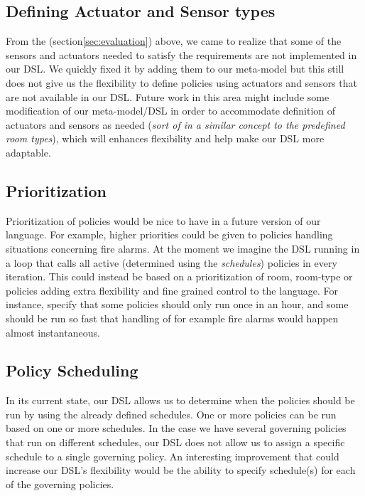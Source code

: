 \subsection{Defining Actuator and Sensor types}\label{subsec:def-sensor-actuator-types}
From the (section\ref{sec:evaluation}) above, we came to realize that some of the sensors and actuators needed to satisfy the requirements are not implemented in our DSL. We quickly fixed it by adding them to our meta-model but this still does not give us the flexibility to define policies using actuators and sensors that are not available in our DSL. Future work in this area might include some modification of our meta-model/DSL in order to accommodate definition of actuators and sensors as needed (\textit{sort of in a similar concept to the predefined room types}), which will enhances flexibility and help make our DSL more adaptable.

\subsection{Prioritization}\label{subsec:looptime}
Prioritization of policies would be nice to have in a future version of our language. For example, higher priorities could be given to policies handling situations concerning fire alarms. At the moment we imagine the DSL running in a loop that calls all active (determined using the \textit{schedules}) policies in every iteration. This could instead be based on a prioritization of room, room-type or policies adding extra flexibility and fine grained control to the language. For instance, specify that some policies should only run once in an hour, and some should be run so fast that handling of for example fire alarms would happen almost instantaneous. 

\subsection{Policy Scheduling}\label{subsec:during}
In its current state, our DSL allows us to determine when the policies should be run by using the already defined schedules. One or more policies can be run based on one or more schedules. In the case we have several governing policies that run on different schedules, our DSL does not allow us to assign a specific schedule to a single governing policy. An interesting improvement that could increase our DSL's flexibility would be the ability to specify schedule(s) for each of the governing policies.